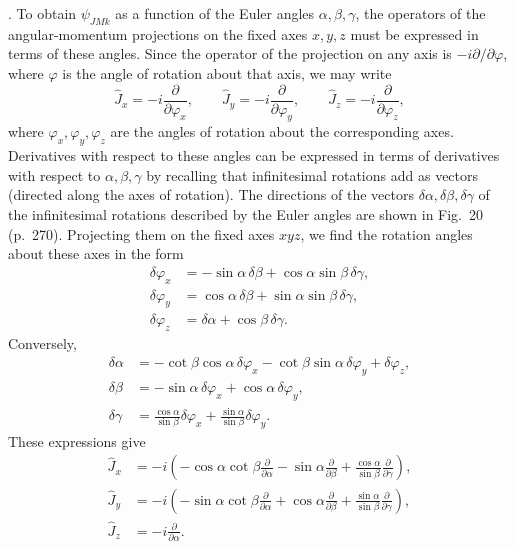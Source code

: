 \SolutionHeading. To obtain $\psi_{JMk}$ as a function of the Euler angles $\alpha,\beta,\gamma$, the operators of the angular-momentum projections on the fixed axes $x,y,z$ must be expressed in terms of these angles. Since the operator of the projection on any axis is $-i\partial/\partial\varphi$, where $\varphi$ is the angle of rotation about that axis, we may write
\[
 \hat J_x=-i\frac{\partial}{\partial\varphi_x},\qquad
 \hat J_y=-i\frac{\partial}{\partial\varphi_y},\qquad
 \hat J_z=-i\frac{\partial}{\partial\varphi_z},
\]
where $\varphi_x,\varphi_y,\varphi_z$ are the angles of rotation about the corresponding axes. Derivatives with respect to these angles can be expressed in terms of derivatives with respect to $\alpha,\beta,\gamma$ by recalling that infinitesimal rotations add as vectors (directed along the axes of rotation). The directions of the vectors $\delta\alpha,\delta\beta,\delta\gamma$ of the infinitesimal rotations described by the Euler angles are shown in Fig.~20 (p.~270). Projecting them on the fixed axes $xyz$, we find the rotation angles about these axes in the form
\[
\begin{aligned}
 \delta\varphi_x&=-\sin\alpha\,\delta\beta+\cos\alpha\sin\beta\,\delta\gamma,\\
 \delta\varphi_y&= \cos\alpha\,\delta\beta+\sin\alpha\sin\beta\,\delta\gamma,\\
 \delta\varphi_z&=\delta\alpha+\cos\beta\,\delta\gamma.
\end{aligned}
\]
Conversely,
\[
\begin{aligned}
 \delta\alpha&=-\cot\beta\cos\alpha\,\delta\varphi_x-\cot\beta\sin\alpha\,\delta\varphi_y+\delta\varphi_z,\\
 \delta\beta&=-\sin\alpha\,\delta\varphi_x+\cos\alpha\,\delta\varphi_y,\\
 \delta\gamma&=\frac{\cos\alpha}{\sin\beta}\delta\varphi_x+\frac{\sin\alpha}{\sin\beta}\delta\varphi_y.
\end{aligned}
\]
These expressions give
\[
\begin{aligned}
 \hat J_x&=-i\left(-\cos\alpha\cot\beta\frac{\partial}{\partial\alpha}-\sin\alpha\frac{\partial}{\partial\beta}+\frac{\cos\alpha}{\sin\beta}\frac{\partial}{\partial\gamma}\right),\\
 \hat J_y&=-i\left(-\sin\alpha\cot\beta\frac{\partial}{\partial\alpha}+\cos\alpha\frac{\partial}{\partial\beta}+\frac{\sin\alpha}{\sin\beta}\frac{\partial}{\partial\gamma}\right),\\
 \hat J_z&=-i\frac{\partial}{\partial\alpha}.
\end{aligned}
\]

